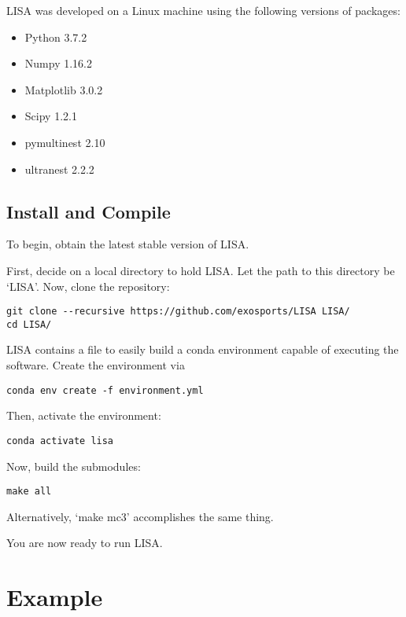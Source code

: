 \documentclass[letterpaper, 12pt]{article}
\begin{document}
\noindent LISA was developed on a Linux machine using the following 
versions of packages:

\begin{itemize}
\item Python 3.7.2
\item Numpy 1.16.2
\item Matplotlib 3.0.2
\item Scipy 1.2.1
\item pymultinest 2.10
\item ultranest 2.2.2
\end{itemize}


\subsection{Install and Compile}
\label{sec:install}

\noindent To begin, obtain the latest stable version of LISA.  \newline

\noindent First, decide on a local directory to hold LISA.  Let the path to this directory 
be `LISA'.  Now, clone the repository:
\begin{verbatim}
git clone --recursive https://github.com/exosports/LISA LISA/
cd LISA/
\end{verbatim}

\noindent LISA contains a file to easily build a conda environment capable of 
executing the software.  Create the environment via

\begin{verbatim}
conda env create -f environment.yml
\end{verbatim}

\noindent Then, activate the environment:

\begin{verbatim}
conda activate lisa
\end{verbatim}

\noindent Now, build the submodules:

\begin{verbatim}
make all
\end{verbatim}

\noindent Alternatively, `make mc3' accomplishes the same thing.\newline

\noindent You are now ready to run LISA.


\section{Example}
\label{sec:example}
\end{document}
